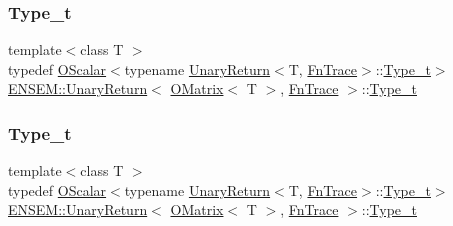 \subsubsection{\texorpdfstring{Type\_t}{Type\_t}\hspace{0.1cm}{\footnotesize\ttfamily [1/3]}}
{\footnotesize\ttfamily template$<$class T $>$ \\
typedef \mbox{\hyperlink{classENSEM_1_1OScalar}{O\+Scalar}}$<$typename \mbox{\hyperlink{structENSEM_1_1UnaryReturn}{Unary\+Return}}$<$T, \mbox{\hyperlink{structENSEM_1_1FnTrace}{Fn\+Trace}}$>$\+::\mbox{\hyperlink{structENSEM_1_1UnaryReturn_3_01OMatrix_3_01T_01_4_00_01FnTrace_01_4_a3a513c4d3321678f089c292ce4a36fe9}{Type\+\_\+t}}$>$ \mbox{\hyperlink{structENSEM_1_1UnaryReturn}{E\+N\+S\+E\+M\+::\+Unary\+Return}}$<$ \mbox{\hyperlink{classENSEM_1_1OMatrix}{O\+Matrix}}$<$ T $>$, \mbox{\hyperlink{structENSEM_1_1FnTrace}{Fn\+Trace}} $>$\+::\mbox{\hyperlink{structENSEM_1_1UnaryReturn_3_01OMatrix_3_01T_01_4_00_01FnTrace_01_4_a3a513c4d3321678f089c292ce4a36fe9}{Type\+\_\+t}}}

\mbox{\label{structENSEM_1_1UnaryReturn_3_01OMatrix_3_01T_01_4_00_01FnTrace_01_4_a3a513c4d3321678f089c292ce4a36fe9}} 
\subsubsection{\texorpdfstring{Type\_t}{Type\_t}\hspace{0.1cm}{\footnotesize\ttfamily [2/3]}}
{\footnotesize\ttfamily template$<$class T $>$ \\
typedef \mbox{\hyperlink{classENSEM_1_1OScalar}{O\+Scalar}}$<$typename \mbox{\hyperlink{structENSEM_1_1UnaryReturn}{Unary\+Return}}$<$T, \mbox{\hyperlink{structENSEM_1_1FnTrace}{Fn\+Trace}}$>$\+::\mbox{\hyperlink{structENSEM_1_1UnaryReturn_3_01OMatrix_3_01T_01_4_00_01FnTrace_01_4_a3a513c4d3321678f089c292ce4a36fe9}{Type\+\_\+t}}$>$ \mbox{\hyperlink{structENSEM_1_1UnaryReturn}{E\+N\+S\+E\+M\+::\+Unary\+Return}}$<$ \mbox{\hyperlink{classENSEM_1_1OMatrix}{O\+Matrix}}$<$ T $>$, \mbox{\hyperlink{structENSEM_1_1FnTrace}{Fn\+Trace}} $>$\+::\mbox{\hyperlink{structENSEM_1_1UnaryReturn_3_01OMatrix_3_01T_01_4_00_01FnTrace_01_4_a3a513c4d3321678f089c292ce4a36fe9}{Type\+\_\+t}}}

